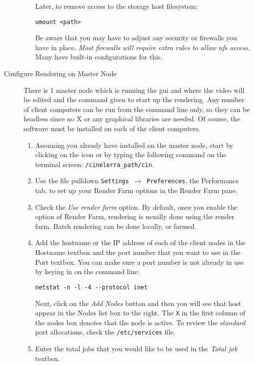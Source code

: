 \begin{description}
\begin{enumerate}
        Later, to remove access to the storage host filesystem:
        \begin{lstlisting}[style=sh]
umount <path>
        \end{lstlisting}

        Be aware that you may have to adjust any security or firewalls you have in place.  \textit{Most firewalls will require extra rules to allow nfs access}.  Many have built-in configurations for this.
    \end{enumerate}
    \item[Configure Rendering on Master Node] There is 1 master node which is running the \CGG{} gui and where the video will be edited and the command given to start up the rendering.  Any number of client computers can be run from the command line only, so they can be headless since no X or any graphical libraries are needed.  Of course, the \CGG{} software must be installed on each of the client computers.
    \begin{enumerate}
        \item Assuming you already have \CGG{} installed on the master node, start \CGG{} by clicking on the
        icon or by typing the following command on the terminal screen:  \texttt{/{cinelerra\_path}/cin}.
        \item Use the file pulldown \texttt{Settings $\rightarrow$ Preferences}, the Performance tab, to set up your Render Farm
        options in the Render Farm pane.
        \item Check the \textit{Use render farm} option.  By default, once you enable the option of Render Farm, rendering is usually done using the render farm.  Batch rendering can be done locally, or farmed.
        \item Add the hostname or the IP address of each of the client nodes in the Hostname textbox and the port
        number that you want to use in the Port textbox.  You can make sure a port number is not already in
        use by keying in on the command line:
        \begin{lstlisting}[style=sh]
netstat -n -l -4 --protocol inet
        \end{lstlisting}
        Next, click on the \textit{Add Nodes}
        button and then you will see that host appear in the Nodes list box to the right.  The \texttt{X} in the first
        column of the nodes box denotes that the node is active.  To review the \textit{standard} port allocations,
        check the \texttt{/etc/services} file.
        \item Enter the total jobs that you would like to be used in the \textit{Total job} textbox.

\end{enumerate}
\end{description}
